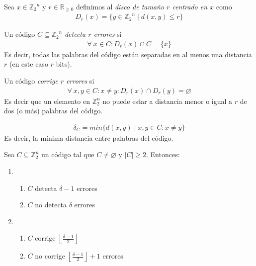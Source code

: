 \begin{definition}
Sea $x\in {\mathbb{Z}_2}^n$ y $r \in \mathbb{R}_{\ge 0}$ definimos al \emph{disco de tamaño $r$ centrado en $x$} como 
\begin{align}
D_r(x) = \{y \in {\mathbb{Z}_2}^n \mid d(x,y) \le r\}
\end{align}
\end{definition}

\begin{definition}
Un código $C \subseteq {\mathbb{Z}_2}^n$ \emph{detecta $r$ errores} si 
\begin{align}
\forall~ x\in C: D_r(x) \cap C = \{x\}
\end{align}
Es decir, todas las palabras del código están separadas en al menos una distancia $r$ (en este caso $r$ bits).
\end{definition}

\begin{definition}
Un código \emph{corrige $r$ errores} si \begin{align}
\forall~ x,y \in C : x\neq y: D_r(x) \cap D_r(y) = \varnothing
\end{align}
Es decir que un elemento en $\mathbb{Z}_2^n$ no puede estar a distancia menor o igual a $r$ de dos (o más) palabras del código.
\end{definition}

\begin{definition}
\begin{align}
    \delta_C = min \{ d(x,y) \mid x,y \in C: x \neq y \}
\end{align}
Es decir, la mínima distancia entre palabras del código.
\end{definition}

\begin{theorem}
Sea $C \subseteq \mathbb{Z}_2^n$ un código tal que $C \neq \varnothing$ y $|C| \ge 2$. Entonces:
\begin{enumerate}
\item
    \begin{enumerate}
        \item $C$ detecta $\delta - 1$ errores
        \item $C$ no detecta $\delta$ errores
    \end{enumerate}
\item
    \begin{enumerate}
        \item $C$ corrige $\left\lfloor{\frac{\delta - 1}{2}}\right\rfloor$
        \item $C$ no corrige $\left\lfloor{\frac{\delta - 1}{2}}\right\rfloor + 1$ errores
    \end{enumerate}
\end{enumerate}
\end{theorem}

